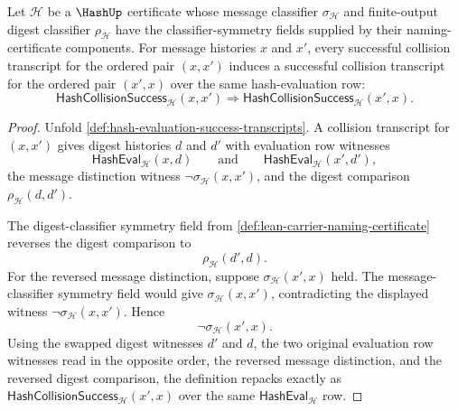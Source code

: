 \begin{theorem}
\label{thm:hash-collision-success-symmetric}
Let $\mathcal H$ be a $\HashUp$ certificate whose message classifier $\sigma_{\mathcal H}$ and finite-output digest classifier $\rho_{\mathcal H}$ have the classifier-symmetry fields supplied by their naming-certificate components. For message histories $x$ and $x'$, every successful collision transcript for the ordered pair $(x,x')$ induces a successful collision transcript for the ordered pair $(x',x)$ over the same hash-evaluation row:
$$
\mathsf{HashCollisionSuccess}_{\mathcal H}(x,x')
\Longrightarrow
\mathsf{HashCollisionSuccess}_{\mathcal H}(x',x).
$$
\end{theorem}
\begin{proof}
Unfold \autoref{def:hash-evaluation-success-transcripts}. A collision transcript for $(x,x')$ gives digest histories $d$ and $d'$ with evaluation row witnesses
$$
\mathsf{HashEval}_{\mathcal H}(x,d)
\qquad\text{and}\qquad
\mathsf{HashEval}_{\mathcal H}(x',d'),
$$
the message distinction witness $\neg\sigma_{\mathcal H}(x,x')$, and the digest comparison $\rho_{\mathcal H}(d,d')$.

The digest-classifier symmetry field from \autoref{def:lean-carrier-naming-certificate} reverses the digest comparison to
$$
\rho_{\mathcal H}(d',d).
$$
For the reversed message distinction, suppose $\sigma_{\mathcal H}(x',x)$ held. The message-classifier symmetry field would give $\sigma_{\mathcal H}(x,x')$, contradicting the displayed witness $\neg\sigma_{\mathcal H}(x,x')$. Hence
$$
\neg\sigma_{\mathcal H}(x',x).
$$
Using the swapped digest witnesses $d'$ and $d$, the two original evaluation row witnesses read in the opposite order, the reversed message distinction, and the reversed digest comparison, the definition repacks exactly as $\mathsf{HashCollisionSuccess}_{\mathcal H}(x',x)$ over the same $\mathsf{HashEval}_{\mathcal H}$ row.
\end{proof}

